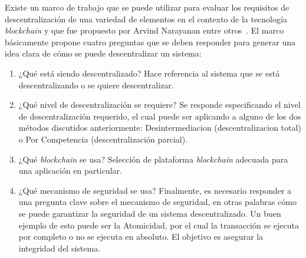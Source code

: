 Existe un marco de trabajo que se puede  utilizar para evaluar los requisitos de descentralización de una variedad de elementos en el contexto de la tecnología \textit{blockchain} y que fue propuesto por Arvind Narayanan entre otros~\cite{narayanan2012critical}. El marco básicamente propone cuatro preguntas que se deben responder para generar una idea clara de cómo se puede descentralizar un sistema:
\begin{enumerate}
    \item ¿Qué está siendo descentralizado?
Hace referencia al sistema que se está descentralizando o se quiere descentralizar.
    \item ¿Qué nivel de descentralización se requiere?
Se responde especificando el nivel de descentralización requerido, el cual puede ser aplicando a alguno de los dos métodos discutidos anteriormente: Desintermediacion (descentralizacion total) o Por Competencia (descentralización parcial).
    \item ¿Qué \textit{blockchain} se usa?
Selección de plataforma \textit{blockchain}  adecuada para una aplicación en particular.
    \item ¿Qué mecanismo de seguridad se usa?
Finalmente, es necesario responder a una pregunta clave sobre el mecanismo de seguridad,  en otras palabras cómo se puede garantizar la seguridad de un sistema descentralizado. Un buen ejemplo de esto puede ser la Atomicidad, por el cual la transacción se ejecuta por completo o no se ejecuta en absoluto. El objetivo es asegurar la integridad del sistema.
\end{enumerate}

